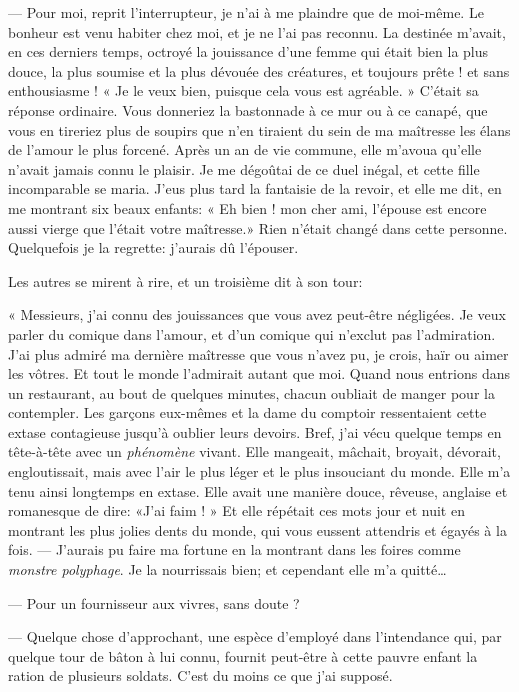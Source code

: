 --- Pour moi, reprit l’interrupteur, je
n’ai à me plaindre que de moi{}-même. Le bonheur est
venu habiter chez moi, et je ne l’ai pas reconnu. La
destinée m’avait, en ces derniers temps, octroyé la
jouissance d’une femme qui était bien la plus douce,
la plus soumise et la plus dévouée des créatures, et toujours prête !
et sans enthousiasme ! « Je le veux bien, puisque cela vous est
agréable. » C’était sa réponse ordinaire. Vous
donneriez la bastonnade à ce mur ou à ce canapé, que vous en tireriez
plus de soupirs que n’en tiraient du sein de ma
maîtresse les élans de l’amour le plus forcené. Après
un an de vie commune, elle m’avoua
qu’elle n’avait jamais connu le
plaisir. Je me dégoûtai de ce duel inégal, et cette fille incomparable
se maria. J’eus plus tard la fantaisie de la revoir,
et elle me dit, en me montrant six beaux enfants: « Eh bien ! mon cher
ami, l’épouse est encore aussi vierge que
l’était votre maîtresse.» Rien
n’était changé dans cette personne. Quelquefois je la
regrette: j’aurais dû l’épouser.

Les autres se mirent à rire, et un troisième dit à son tour:

« Messieurs, j’ai connu des jouissances que vous avez
peut{}-être négligées. Je veux parler du comique dans
l’amour, et d’un comique qui
n’exclut pas l’admiration.
J’ai plus admiré ma dernière maîtresse que vous
n’avez pu, je crois, haïr ou aimer les vôtres. Et tout
le monde l’admirait autant que moi. Quand nous
entrions dans un restaurant, au bout de quelques minutes, chacun
oubliait de manger pour la contempler. Les garçons eux{}-mêmes et la
dame du comptoir ressentaient cette extase contagieuse
jusqu’à oublier leurs devoirs. Bref,
j’ai vécu quelque temps en tête{}-à{}-tête avec un
\textit{phénomène} vivant. Elle mangeait, mâchait, broyait, dévorait,
engloutissait, mais avec l’air le plus léger et le
plus insouciant du monde. Elle m’a tenu ainsi
longtemps en extase. Elle avait une manière douce, rêveuse, anglaise et
romanesque de dire: «J’ai faim ! » Et elle répétait
ces mots jour et nuit en montrant les plus jolies dents du monde, qui
vous eussent attendris et égayés à la fois. --- J’aurais
pu faire ma fortune en la montrant dans les foires comme \textit{monstre
polyphage}. Je la nourrissais bien; et cependant elle
m’a quitté\ldots\ 

--- Pour un fournisseur aux vivres, sans
doute ?

--- Quelque chose d’approchant, une espèce
d’employé dans l’intendance qui, par
quelque tour de bâton à lui connu, fournit peut{}-être à cette pauvre
enfant la ration de plusieurs soldats. C’est du moins
ce que j’ai supposé.

